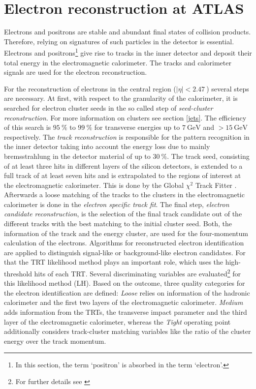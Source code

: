 \section{Electron reconstruction at ATLAS}\label{eReconstruction}
Electrons and positrons are stable and abundant final states of collision products. Therefore, relying on signatures of such particles in the detector is essential. Electrons and positrons\footnote{In this section, the term `positron' is absorbed in the term `electron'.} give rise to tracks in the inner detector and deposit their total energy in the electromagnetic calorimeter. The tracks and calorimeter signals are used for the electron reconstruction. \cite{ePerformance}\par
For the reconstruction of electrons in the central region ($|\eta|<\SI{2.47}{}$) several steps are necessary. At first, with respect to the granularity of the calorimeter, it is searched for electron cluster seeds in the so called step of \textit{seed-cluster reconstruction}. For more information on clusters see section \ref{jets}. The efficiency of this search is $\SI{95}{\percent}$ to $\SI{99}{\percent}$ for transverse energies up to $\SI{7}{\giga\electronvolt}$ and $>\SI{15}{\giga\electronvolt}$ respectively. The \textit{track reconstruction} is responsible for the pattern recognition in the inner detector taking into account the energy loss due to mainly bremsstrahlung in the detector material of up to $\SI{30}{\percent}$. The track seed, consisting of at least three hits in different layers of the silicon detectors, is extended to a full track of at least seven hits and is extrapolated to the regions of interest at the electromagnetic calorimeter. This is done by the {\ATLAS} Global $\chi^2$ Track Fitter \cite{trackfitter}. Afterwards a loose matching of the tracks to the clusters in the electromagnetic calorimeter is done in the \textit{electron specific track fit}. The final step, \textit{electron candidate reconstruction}, is the selection of the final track candidate out of the different tracks with the best matching to the initial cluster seed. \cite{ePerformance}\newline
Both, the information of the track and the energy cluster, are used for the four-momentum calculation of the electrons. Algorithms for reconstructed electron identification are applied to distinguish signal-like or background-like electron candidates. For that the TRT likelihood method plays an important role, which uses the high-threshold hits of each TRT. Several discriminating variables are evaluated\footnote{For further details see \cite{ePerformance}} for this likelihood method (LH). Based on the outcome, three quality categories for the electron identification are defined: \textit{Loose} relies on information of the hadronic calorimeter and the first two layers of the electromagnetic calorimeter. \textit{Medium} adds information from the TRTs, the transverse impact parameter and the third layer of the electromagnetic calorimeter, whereas the \textit{Tight} operating point additionally considers track-cluster matching variables like the ratio of the cluster energy over the track momentum. \cite{ePerformance}\newline
